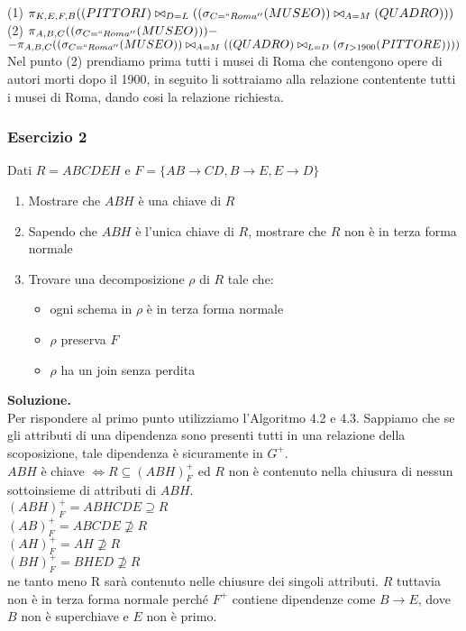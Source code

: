  \noindent(1) $\pi_{K, E, F, B}((PITTORI)\bowtie_{D=L}((\sigma_{C=``Roma''}(MUSEO))\bowtie_{A=M}(QUADRO)))$\\
 (2) $\pi_{A,B,C}((\sigma_{C=``Roma''}(MUSEO))) - $\\ $ - \pi_{A,B,C}((\sigma_{C=``Roma''}(MUSEO))\bowtie_{A=M}((QUADRO)\bowtie_{L=D}(\sigma_{I>1900}(PITTORE))))$\\
  
  Nel punto (2) prendiamo prima tutti i musei di Roma che contengono opere di autori morti dopo il 1900, in seguito li 
  sottraiamo alla relazione contentente tutti i musei di Roma, dando cosi la relazione richiesta.
  \subsubsection{Esercizio 2}
   Dati $R=ABCDEH$ e $F=\{AB\rightarrow CD, B\rightarrow E, E\rightarrow D\}$

 \begin{enumerate}
  \item Mostrare che $ABH$ è una chiave di $R$
  \item Sapendo che $ABH$ è l’unica chiave di $R$, mostrare che $R$ non è in terza forma normale
  \item Trovare una decomposizione $\rho$ di $R$ tale che:
   \begin{itemize}
    \item ogni schema in $\rho$ è in terza forma normale
    \item $\rho$ preserva $F$
    \item $\rho$ ha un join senza perdita
   \end{itemize}
 \end{enumerate}

 \noindent\textbf{\fontsize{14pt}{1em}Soluzione.}\\
 Per rispondere al primo punto utilizziamo l'Algoritmo 4.2 e 4.3. Sappiamo che se gli attributi di una dipendenza sono presenti
 tutti in una relazione della scoposizione, tale dipendenza è sicuramente in $G^+$.\\
 
 \noindent$ABH$ è chiave $\Leftrightarrow R\subseteq (ABH)^+_F$ ed $R$ non è contenuto nella chiusura di nessun sottoinsieme di
 attributi di $ABH$.\\
 $(ABH)^+_F= ABHCDE \supseteq R$\\
 $(AB)^+_F = ABCDE \not\supseteq R$\\
 $(AH)^+_F = AH \not\supseteq R$\\
 $(BH)^+_F= BHED \not\supseteq R$\\
 ne tanto meno R sarà contenuto nelle chiusure dei singoli attributi. $R$ tuttavia non è in terza forma normale perché $F^+$ 
 contiene dipendenze come $B\rightarrow E$, dove $B$ non è superchiave e $E$ non è primo.\\
 
